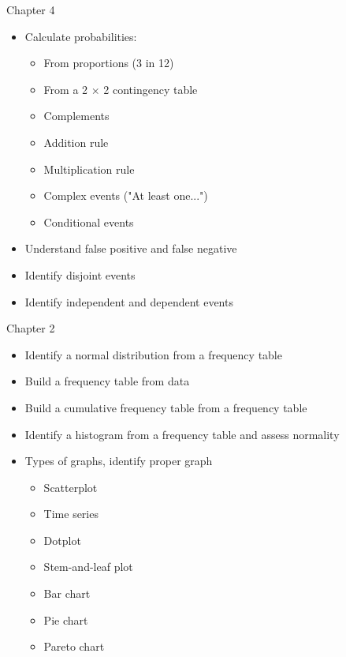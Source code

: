 \documentclass[xcolor=table]{beamer}
\begin{document}
\begin{frame}{Chapter 4}
\begin{block}{}
\large
\begin{itemize}
\item Calculate probabilities:
\begin{itemize}
\item From proportions (3 in 12)
\item From a 2 $\times$ 2 contingency table
\item Complements
\item Addition rule
\item Multiplication rule
\item Complex events ("At least one...")
\item Conditional events
\end{itemize}
\item Understand false positive and false negative
\item Identify disjoint events
\item Identify independent and dependent events
\end{itemize}
\end{block}
\end{frame}


\begin{frame}{Chapter 2}
\begin{block}{}
\large
\begin{itemize}
\item Identify a normal distribution from a frequency table
\item Build a frequency table from data
\item Build a cumulative frequency table from a frequency table
\item Identify a histogram from a frequency table and assess normality
\item Types of graphs, identify proper graph
\begin{itemize}
\item Scatterplot
\item Time series
\item Dotplot
\item Stem-and-leaf plot
\item Bar chart
\item Pie chart
\item Pareto chart
\end{itemize}
\end{itemize}
\end{block}
\end{frame}
\end{document}
